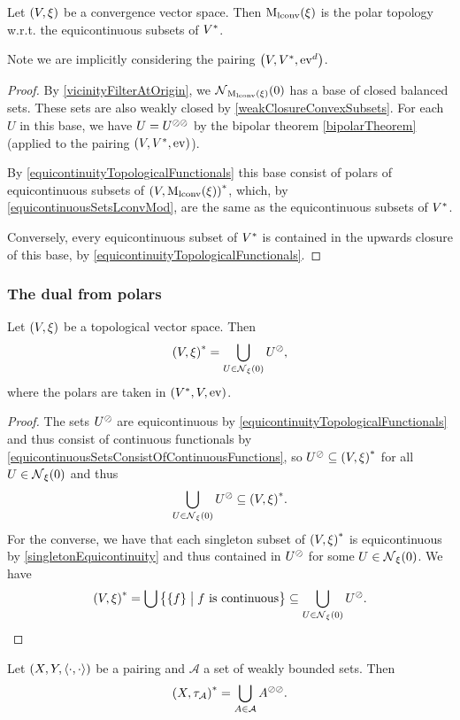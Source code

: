 \begin{proposition}
Let $\left( V, \xi \right)$ be a convergence vector space. Then $\operatorname{M_\text{lconv}}(\xi)$ is the polar topology w.r.t. the equicontinuous subsets of ${V}^*$.
\end{proposition}
Note we are implicitly considering the pairing $\left( V,{V}^*,\operatorname{ev}^d \right)$.
\begin{proof}
By \ref{vicinityFilterAtOrigin}, we $\operatorname{\mathcal{N}}_{\operatorname{M_\text{lconv}}(\xi)}(0)$ has a base of closed balanced sets. These sets are also weakly closed by \ref{weakClosureConvexSubsets}. For each $U$ in this base, we have $U = U^{\oslash\oslash}$ by the bipolar theorem \ref{bipolarTheorem} (applied to the pairing $\left( V,{V}^*, \operatorname{ev} \right)$).

By \ref{equicontinuityTopologicalFunctionals} this base consist of polars of equicontinuous subsets of ${\left( V, \operatorname{M_\text{lconv}}(\xi) \right)}^*$, which, by \ref{equicontinuousSetsLconvMod}, are the same as the equicontinuous subsets of ${V}^*$.

Conversely, every equicontinuous subset of ${V}^*$ is contained in the upwards closure of this base, by \ref{equicontinuityTopologicalFunctionals}.
\end{proof}


\subsubsection{The dual from polars}
\begin{proposition}
Let $\left( V,\xi \right)$ be a topological vector space. Then
\[ {\left( V, \xi \right)}^* = \bigcup_{U\in \operatorname{\mathcal{N}}_\xi(0)}U^\oslash, \]
where the polars are taken in $\left( {V}^*, V, \operatorname{ev} \right)$.
\end{proposition}
\begin{proof}
The sets $U^\oslash$ are equicontinuous by \ref{equicontinuityTopologicalFunctionals} and thus consist of continuous functionals by \ref{equicontinuousSetsConsistOfContinuousFunctions}, so $U^\oslash \subseteq {\left( V, \xi \right)}^*$ for all $U\in \operatorname{\mathcal{N}}_\xi(0)$ and thus
\[ \bigcup_{U\in \operatorname{\mathcal{N}}_\xi(0)}U^\oslash \subseteq {\left( V, \xi \right)}^*. \]
For the converse, we have that each singleton subset of ${\left( V,\xi \right)}^*$ is equicontinuous by \ref{singletonEquicontinuity} and thus contained in $U^\oslash$ for some  $U\in \operatorname{\mathcal{N}}_\xi(0)$.
We have
\[ \dual{\sSet{V, \xi}} = \bigcup \setbuilder[\big]{\{f\}}{\text{$f$ is continuous}} \subseteq \bigcup_{U\in \neighbourhood_\xi(0)}U^\pol. \]
\end{proof}
\begin{corollary}
Let $\left( X,Y,\left\langle \cdot,\cdot \right\rangle \right)$ be a pairing and $\mathcal{A}$ a set of weakly bounded sets. Then
\[ {\left( X, \tau_{\mathcal{A}} \right)}^* = \bigcup_{A\in \mathcal{A}}A^{\oslash\oslash}. \]
\end{corollary}


